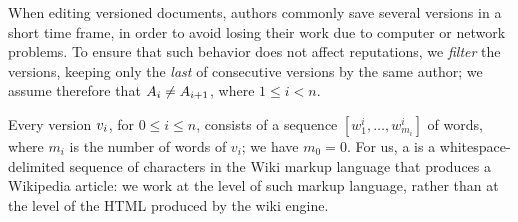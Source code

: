 When editing versioned documents, authors commonly save several
versions in a short time frame, in order to avoid losing their work
due to computer or network problems.
To ensure that such behavior does not affect reputations, we
\textit{filter} the versions, keeping only the \textit{last} of consecutive
versions by the same author; we assume therefore that
$A_{i} \neq A_{i+1}$,
where $1 \leq i < n$.

Every version $v_{i}$, for $0 \leq i \leq n$, consists of a sequence
$[w^i_1, \ldots, w^i_{m_i}]$ of words, where $m_i$ is the number of
words of $v_i$; we have $m_0 = 0$.
For us, a  is a whitespace-delimited sequence of
characters in the Wiki markup language that produces a Wikipedia article:
we work at the level of such markup language, rather than at the level
of the HTML produced by the wiki engine.


